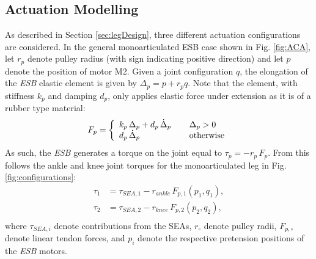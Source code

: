 \documentclass[letterpaper, 10 pt, conference]{ieeeconf}  %
\begin{document}
\subsection{Actuation Modelling}
\label{subsec:actuationModel}
As described in Section \ref{sec:legDesign}, three different actuation configurations are considered. In the general monoarticulated ESB case shown in Fig. \ref{fig:ACA}, let $r_p$ denote pulley radius (with sign indicating positive direction) and let $p$ denote the position of motor M2. Given a joint configuration $q$, the elongation of the \textit{ESB} elastic element is given by $\Delta_p = p + r_p q$. Note that the element, with stiffness $k_p$ and damping $d_p$, only applies elastic force under extension as it is of a rubber type material:
\begin{equation}
	F_p =	\left\lbrace
	\begin{array}{ll}
	k_p \, \Delta_p + d_p \, \dot{\Delta}_p	\hspace{0.4cm} & \Delta_p > 0\\
	d_p \, \dot{\Delta}_p & \text{otherwise}
	\end{array}
	\right.
	\label{eq:F_p}
\end{equation}   
As such, the \textit{ESB} generates a torque on the joint equal to $\tau_p = -r_p \, F_p$. From this follows the ankle and knee joint torques for the monoarticulated leg in Fig. \ref{fig:configurations}:
\begin{equation}
	\begin{aligned}
		\tau_1 &= \tau_{SEA,1} - r_{ankle} \, F_{p,1}(p_1,q_1), \\
		\tau_2 &= \tau_{SEA,2} - r_{knee} \, F_{p,2}(p_2,q_2), \\
	\end{aligned}
\end{equation}
where $\tau_{SEA,i}$ denote contributions from the SEAs, $r_\circ$ denote pulley radii, $F_{p,\circ}$ denote linear tendon forces, and $p_i$ denote the respective pretension positions of the \textit{ESB} motors.
\end{document}
